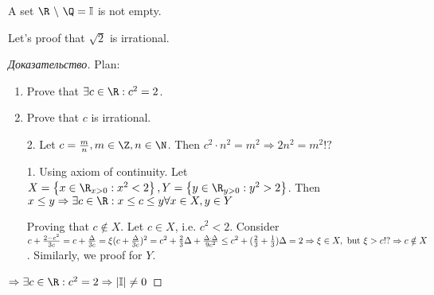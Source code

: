 \begin{theorem}
	A set $\R \ \backslash \ \Q = \mathbb{I}$ is not empty.
\end{theorem}

Let's proof that $\sqrt{2}$ is irrational.
\begin{proof}[Доказательство]
	Plan:
	\begin{enumerate}
		\item Prove that $\exists c \in \R: c^2=2$.
		\item  Prove that $c$ is irrational.
	\end{enumerate}	
	\begin{enumerate}
		\item [2. ] Let $c = \frac{m}{n}, m \in \Z, n \in \N$. Then $c^2 \cdot n^2 = m^2 \Rightarrow 2n^2 = m^2 !?$
		\item [1. ] Using axiom of continuity. Let $X = \left\{ x \in \R_{x > 0}: x^{2} < 2 \right \} , Y = \left\{ y \in \R_{y > 0}: y^2>2 \right \} $. Then $x \leq y \Rightarrow \exists c \in \R: x \leq c \leq y \forall x \in X, y \in Y$ 
			
	Proving that $c \notin X$. Let  $c \in X$, i.e. $c^2 < 2$. Consider $c + \frac{2 - c^2}{3c} = c + \frac{\Delta}{3c} = \xi \\ (c + \frac{\Delta}{3c})^2 = c^2 + \frac{2}{3}\Delta + \frac{\Delta \cdot \Delta}{9c^2} \leq c^2 + (\frac{2}{3} + \frac{1}{3})\Delta = 2 \Rightarrow \xi \in X, \text{ but } \xi > c !? \Rightarrow c \notin X$. Similarly, we proof for $Y$.
	\end{enumerate}
	$ \Rightarrow \exists c \in \R: c^2 = 2 \Rightarrow |\mathbb{I}| \neq 0$
\end{proof}
